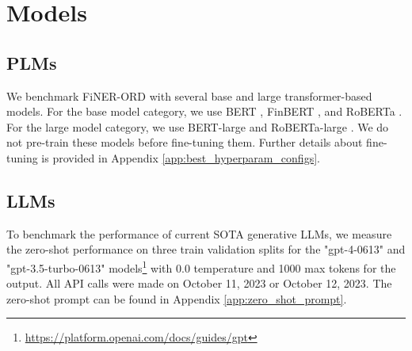 \documentclass[11pt]{article}
\begin{document}
\section{Models}

\subsection{PLMs}
We benchmark FiNER-ORD with several base and large transformer-based models. For the base model category, we use BERT \citep{bert}, FinBERT \citep{finbert_yang2020}, and RoBERTa \citep{roberta}. For the large model category, we use BERT-large \citep{bert} and RoBERTa-large \citep{roberta}. We do not pre-train these models before fine-tuning them. Further details about fine-tuning is provided in Appendix \ref{app:best_hyperparam_configs}. 



\subsection{LLMs}
\label{sec:llm-exps}
To benchmark the performance of current SOTA generative LLMs, we measure the zero-shot performance on three train validation splits for the "gpt-4-0613" and "gpt-3.5-turbo-0613" models\footnote{\url{https://platform.openai.com/docs/guides/gpt}} with 0.0 temperature and 1000 max tokens for the output. All API calls were made on October 11, 2023 or October 12, 2023. The zero-shot prompt can be found in Appendix \ref{app:zero_shot_prompt}.
\end{document}
